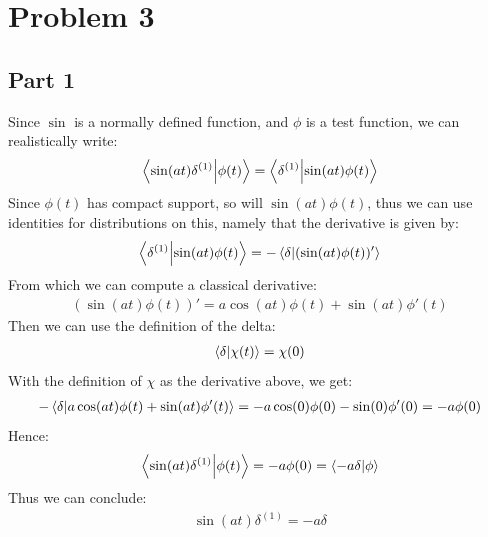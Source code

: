\documentclass[12pt]{article}
\begin{document}
\section*{Problem 3}
\subsection*{Part 1}
Since $\sin$ is a normally defined function, and $\phi$ is a test function, we can realistically write:
\begin{align*}
  \ip{\sin(at)\delta^{(1)}}{\phi(t)}=\ip{\delta^{(1)}}{\sin(at)\phi(t)}
\end{align*}
Since $\phi(t)$ has compact support, so will $\sin(at)\phi(t)$, thus we can use identities for distributions on this, namely that the derivative is given by:
\begin{align*}
  \ip{\delta^{(1)}}{\sin(at)\phi(t)}=-\ip{\delta}{(\sin(at)\phi(t))'}
\end{align*}
From which we can compute a classical derivative:
\begin{align*}
  (\sin(at)\phi(t))'=a\cos(at)\phi(t)+\sin(at)\phi'(t)
\end{align*}
Then we can use the definition of the delta:
\begin{align*}
  \ip{\delta}{\chi(t)}=\chi(0)
\end{align*}
With the definition of $\chi$ as the derivative above, we get:
\begin{align*}
  -\ip{\delta}{a\cos(at)\phi(t)+\sin(at)\phi'(t)}=
  -a\cos(0)\phi(0)-\sin(0)\phi'(0)=-a\phi(0)
\end{align*}
Hence:
\begin{align*}
  \ip{\sin(at)\delta^{(1)}}{\phi(t)}=-a\phi(0)=\ip{-a\delta}{\phi}
\end{align*}
Thus we can conclude:
\begin{align}
  \boxed{\sin(at)\delta^{(1)}=-a\delta}
\end{align}
\end{document}
